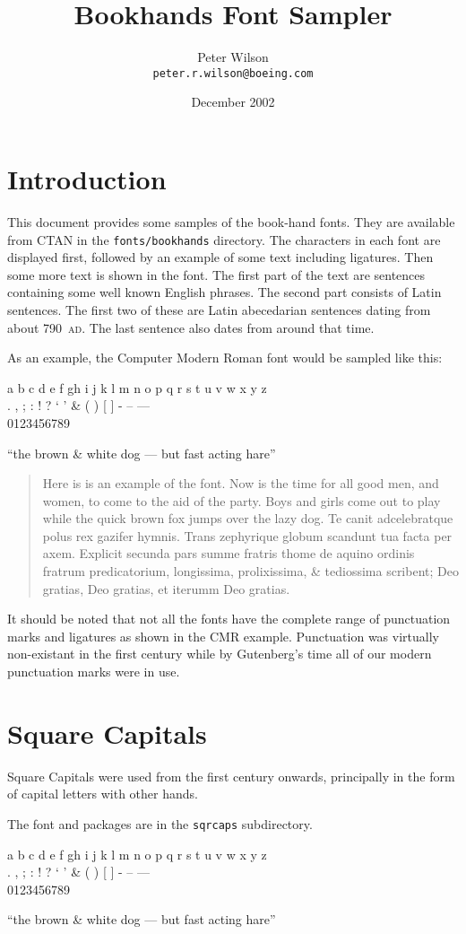 \documentclass{article}
\title{Bookhands Font Sampler}
\author{Peter Wilson\\ \texttt{peter.r.wilson@boeing.com}}
\date{December 2002}
\newcommand{\abc}{a b c d e f gh i j k l m n o p q r s t u v w x y z}
\newcommand{\punct}{. , ; : ! ? ` ' \& ( ) [ ]}
\newcommand{\figs}{0123456789}
\newcommand{\dashes}{- -- ---}
\newcommand{\ligs}{``the brown \& white dog --- but fast acting hare''}
\newcommand{\sentence}{%
    now is the time for all good
men, and women, to come to the aid of the party while the quick brown fox
jumps over the lazy dog.}
\newcommand{\latin}{%
    Te canit adcelebratque polus rex gazifer hymnis.
Trans zephyrique globum scandunt tua facta per axem.
Explicit secunda pars summe fratris thome de aquino
ordinis fratrum predicatorium, longissima, prolixissima,
\& tediossima scribent; Deo gratias, Deo gratias, et iterumm
Deo gratias.
}
\renewcommand{\sentence}{%
Here is is an example of the font. Now is the time for all good
men, and women, to come to the aid of the party. Boys and girls come
out to play while the quick brown fox jumps over the lazy dog.}
\begin{document}
\maketitle
\tableofcontents
\clearpage

\section{Introduction}

    This document provides some samples of the book-hand fonts. They are
available from CTAN in the \texttt{fonts/bookhands} directory. The 
characters in each font are displayed first, followed by an example
of some text including ligatures. Then some more text is
shown in the font. The first part of the text are sentences containing some
well known English phrases. The second part consists of Latin
sentences. The first two of these are Latin
abecedarian sentences dating from about 790~\textsc{ad}. The last
sentence also dates from around that time.

    As an example, the Computer Modern Roman font would be sampled like this:
\begin{center}
\abc \\
\punct{} \dashes \\
\figs 

\ligs\par
\end{center}

\begin{quotation}
\sentence{} \latin \par
\end{quotation}

    It should be noted that not all the fonts have the complete range of
punctuation marks and ligatures as shown in the CMR example. Punctuation
was virtually non-existant in the first century while by Gutenberg's time
all of our modern punctuation marks were in use.

\clearpage

\section{Square Capitals}

    Square Capitals were used from the first century onwards, principally
in the form of capital letters with other hands. 

    The font and packages are in the \texttt{sqrcaps} subdirectory.

\begin{center}
\sqrcfamily
\abc \\
\punct{} \dashes \\
\figs 

\ligs\par
\end{center}
\end{document}
